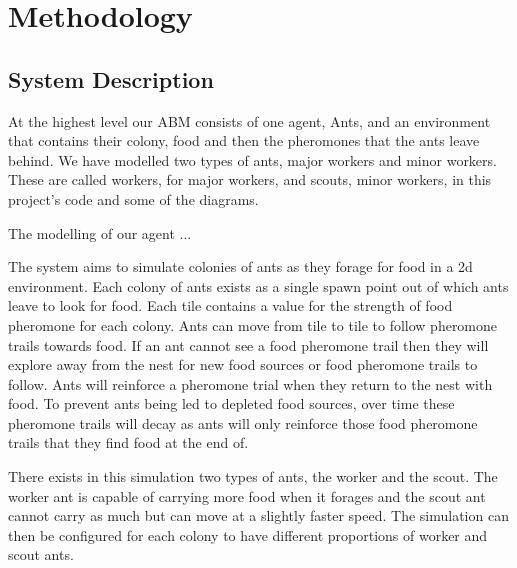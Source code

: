  \section{Methodology}
 
 
 
 \subsection{System Description}
 
At the highest level our ABM consists of one agent, Ants, and an environment that contains their colony, food and then the pheromones that the ants leave behind. We have modelled two types of ants, major workers and minor workers. These are called workers, for major workers, and scouts, minor workers, in this project's code and some of the diagrams.\par
The modelling of our agent ...
 
The system aims to simulate colonies of ants as they forage for food in a 2d environment. Each colony of ants exists as a single spawn point out of which ants leave to look for food. Each tile contains a value for the strength of food pheromone for each colony. Ants can move from tile to tile to follow pheromone trails towards food. If an ant cannot see a food pheromone trail then they will explore away from the nest for new food sources or food pheromone trails to follow. Ants will reinforce a pheromone trial when they return to the nest with food. To prevent ants being led to depleted food sources, over time these pheromone trails will decay as ants will only reinforce those food pheromone trails that they find food at the end of.\par
There exists in this simulation two types of ants, the worker and the scout. The worker ant is capable of carrying more food when it forages and the scout ant cannot carry as much but can move at a slightly faster speed. The simulation can then be configured for each colony to have different proportions of worker and scout ants.\par

